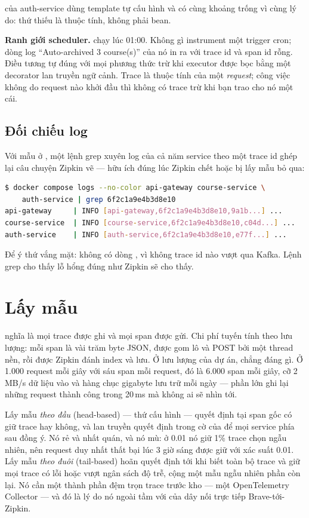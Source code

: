  của auth-service dùng template tự cấu
hình và có cùng khoảng trống vì cùng lý do: thứ thiếu là thuộc tính,
không phải bean.

\textbf{Ranh giới scheduler.}  chạy
 lúc 01:00. Không gì instrument một trigger cron; dòng
log ``Auto-archived 3 course(s)'' của nó in ra với trace id và span id
rỗng. Điều tương tự đúng với mọi phương thức  trừ khi
executor được bọc bằng một decorator lan truyền ngữ cảnh. Trace là
thuộc tính của một \emph{request}; công việc không do request nào khởi
đầu thì không có trace trừ khi bạn trao cho nó một cái.

\subsection{Đối chiếu log}

Với mẫu ở , một lệnh grep xuyên log của cả năm service theo một
trace id ghép lại câu chuyện Zipkin vẽ --- hữu ích đúng lúc Zipkin
chết hoặc bị lấy mẫu bỏ qua:

\begin{lstlisting}[language=bash]
$ docker compose logs --no-color api-gateway course-service \
    auth-service | grep 6f2c1a9e4b3d8e10
api-gateway     | INFO [api-gateway,6f2c1a9e4b3d8e10,9a1b...] ...
course-service  | INFO [course-service,6f2c1a9e4b3d8e10,c04d...] ...
auth-service    | INFO [auth-service,6f2c1a9e4b3d8e10,e77f...] ...
\end{lstlisting}

Để ý thứ vắng mặt: không có dòng , vì không
trace id nào vượt qua Kafka. Lệnh grep cho thấy lỗ hổng đúng như Zipkin
sẽ cho thấy.

\section{Lấy mẫu}
\label{sec:sampling}

 nghĩa là mọi trace được ghi và mọi span được
gửi. Chi phí tuyến tính theo lưu lượng: mỗi span là vài trăm byte JSON,
được gom lô và POST bởi một thread nền, rồi được Zipkin đánh index và
lưu. Ở lưu lượng của dự án, chẳng đáng gì. Ở 1.000 request mỗi giây
với sáu span mỗi request, đó là 6.000 span mỗi giây, cỡ 2\,MB/s dữ liệu
vào và hàng chục gigabyte lưu trữ mỗi ngày --- phần lớn ghi lại những
request thành công trong 20\,ms mà không ai sẽ nhìn tới.

Lấy mẫu \emph{theo đầu} (head-based) --- thứ  cấu
hình --- quyết định tại span gốc có giữ trace hay không, và lan truyền
quyết định trong cờ của \code{traceparent} để mọi service phía sau đồng
ý. Nó rẻ và nhất quán, và nó mù: ở 0.01 nó giữ 1\% trace chọn ngẫu
nhiên, nên request duy nhất thất bại lúc 3 giờ sáng được giữ với xác
suất 0.01. Lấy mẫu \emph{theo đuôi} (tail-based) hoãn quyết định tới
khi biết toàn bộ trace và giữ mọi trace có lỗi hoặc vượt ngân sách độ
trễ, cộng một mẫu ngẫu nhiên phần còn lại. Nó cần một thành phần đệm
trọn trace trước kho --- một OpenTelemetry Collector --- và đó là lý do
nó ngoài tầm với của dây nối trực tiếp Brave-tới-Zipkin.

